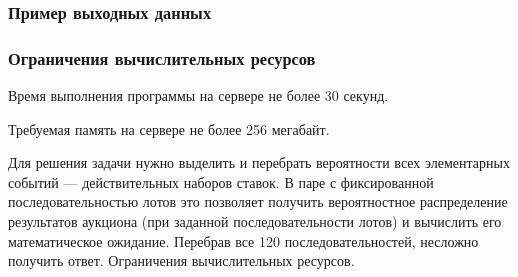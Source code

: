 
\subsubsection*{Пример выходных данных}


\subsubsection*{Ограничения вычислительных ресурсов}

Время выполнения программы на сервере не более 30 секунд.

Требуемая память на сервере не более 256 мегабайт.

\solutionSection

Для решения задачи нужно выделить и перебрать вероятности всех элементарных событий — действительных наборов ставок. В паре с фиксированной последовательностью лотов это позволяет получить вероятностное распределение результатов аукциона (при заданной последовательности лотов) и вычислить его математическое ожидание. Перебрав все 120 последовательностей, несложно получить ответ. Ограничения вычислительных ресурсов.

